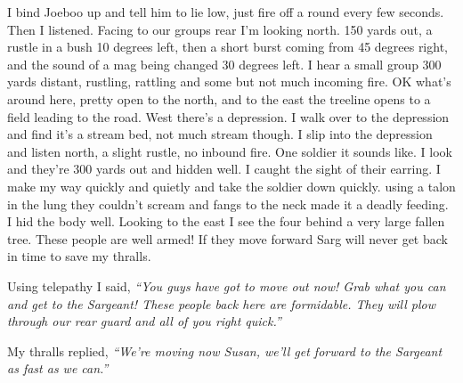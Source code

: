 I bind Joeboo up and tell him to lie low, just fire off a round every few seconds. Then I listened. Facing to our groups rear I'm looking north. 150 yards out, a rustle in a bush 10 degrees left, then a short burst coming from 45 degrees right, and the sound of a mag being changed 30 degrees left. I hear a small group 300 yards distant, rustling, rattling and some but not much incoming fire. OK what's around here, pretty open to the north, and to the east the treeline opens to a field leading to the road. West there's a depression. I walk over to the depression and find it's a stream bed, not much stream though. I slip into the depression and listen north, a slight rustle, no inbound fire. One soldier it sounds like. I look and they're 300 yards out and hidden well. I caught the sight of their earring. I make my way quickly and quietly and take the soldier down quickly. using a talon in the lung they couldn't scream and fangs to the neck made it a deadly feeding. I hid the body well. Looking to the east I see the four behind a very large fallen tree. These people are well armed! If they move forward Sarg will never get back in time to save my thralls.

Using telepathy I said, \textit{``You guys have got to move out now! Grab what you can and get to the Sargeant! These people back here are formidable. They will plow through our rear guard and all of you right quick.''}

My thralls replied, \textit{``We're moving now Susan, we'll get forward to the Sargeant as fast as we can.''}






